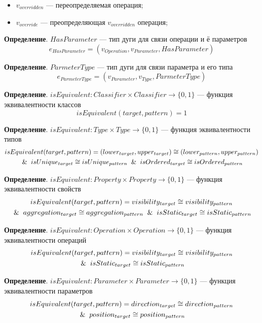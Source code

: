 \begin{itemize}
\item $v_{overridden}$ --- переопределяемая операция;
\item $v_{override}$ --- преопределяющая $v_{overridden}$ операция;
\end{itemize}

\textbf{Определение}. $HasParameter$ --- тип дуги для связи операции и ё параметров
%
$$e_{HasParameter} = (v_{Operation}, v_{Parameter}, HasParameter)$$

\textbf{Определение}. $ParmeterType$ --- тип дуги для связи параметра и его типа
%
$$e_{ParmeterType} = (v_{Parameter}, v_{Type}, ParmeterType)$$

\textbf{Определение}. $isEquivalent: Classifier \times Classifier \to \{ 0, 1 \}$
--- функция эквивалентности классов
%
$$isEquivalent(target, pattern) = 1$$

\textbf{Определение}. $isEquivalent: Type \times Type \to \{ 0, 1 \}$
--- функция эквивалентности типов
%
\begin{multline*}
isEquivalent(target, pattern) = (lower_{target}, upper_{target}) \cong (lower_{pattern}, upper_{pattern}) \\
\And isUnique_{target} \cong isUnique_{pattern} \And isOrdered_{target} \cong isOrdered_{pattern}
\end{multline*}

\textbf{Определение}. $isEquivalent: Property \times Property \to \{ 0, 1 \}$
--- функция эквивалентности свойств
%
\begin{multline*}
isEquivalent(target, pattern) = visibility_{target} \cong visibility_{pattern} \\
\And aggregation_{target} \cong aggregation_{pattern} \And isStatic_{target} \cong isStatic_{pattern}
\end{multline*}

\textbf{Определение}. $isEquivalent: Operation \times Operation \to \{ 0, 1 \}$
--- функция эквивалентности операций
%
\begin{multline*}
isEquivalent(target, pattern) = visibility_{target} \cong visibility_{pattern} \\
\And isStatic_{target} \cong isStatic_{pattern}
\end{multline*}

\textbf{Определение}. $isEquivalent: Parameter \times Parameter \to \{ 0, 1 \}$
--- функция эквивалентности параметров
%
\begin{multline*}
isEquivalent(target, pattern) = direction_{target} \cong direction_{pattern} \\
\And position_{target} \cong position_{pattern}
\end{multline*}

